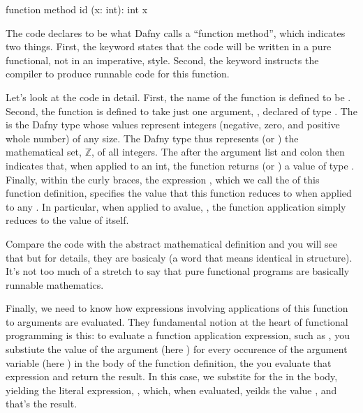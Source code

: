 \documentclass[letterpaper,10pt,english]{sphinxmanual}
\begin{document}
\begin{sphinxVerbatim}[commandchars=\\\{\}]
function method id (x: int): int \PYGZob{} x \PYGZcb{}
\end{sphinxVerbatim}

The code declares  to be what Dafny calls a “function method”,
which indicates two things.  First, the  keyword states that
the code will be written in a pure functional, not in an imperative,
style. Second, the  keyword instructs the compiler to produce
runnable code for this function.

Let’s look at the code in detail. First, the name of the function is
defined to be . Second, the function is defined to take just one
argument, , declared of type .  The is the Dafny type whose
values represent integers (negative, zero, and positive whole number)
of any size. The Dafny type  thus represents (or )
the mathematical set, \({\mathbb Z}\), of all integers. The 
after the argument list and colon then indicates that, when applied to
an int, the function returns (or ) a value of type .
Finally, within the curly braces, the expression , which we call
the  of this function definition, specifies the value that this
function reduces to when applied to any . In particular, when
applied to avalue, , the function application simply reduces to the
value of  itself.

Compare the code with the abstract mathematical definition and you
will see that but for details, they are basicaly  (a word
that means identical in structure). It’s not too much of a stretch to
say that pure functional programs are basically runnable mathematics.

Finally, we need to know how expressions involving applications of
this function to arguments are evaluated. They fundamental notion at
the heart of functional programming is this: to evaluate a function
application expression, such as , you substiute the value of
the argument (here ) for every occurence of the argument variable
(here ) in the body of the function definition, the you evaluate
that expression and return the result. In this case, we substite 
for the  in the body, yielding the literal expression, , which,
when evaluated, yeilds the value , and that’s the result.
\end{document}
